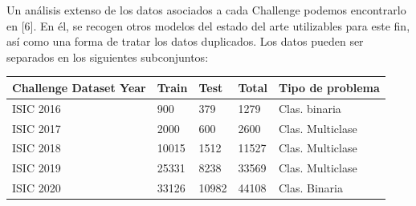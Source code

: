 Un análisis extenso de los datos asociados a cada Challenge podemos encontrarlo en [6]. En él, se recogen otros modelos del estado del arte utilizables para este fin, así como una forma de tratar los datos duplicados. Los datos pueden ser separados en los siguientes subconjuntos:

\begin{table}[H]
	\centering
	\begin{tabular}{|l|l|l|l|l|}
		\hline
		\textbf{Challenge Dataset Year} & \textbf{Train} & \textbf{Test} & \textbf{Total} & \textbf{Tipo de problema } \\ \hline
		ISIC 2016 & 900 & 379 & 1279 & Clas. binaria  \\ \hline
		ISIC 2017 & 2000 & 600 & 2600 & Clas. Multiclase  \\ \hline
		ISIC 2018 & 10015 & 1512 & 11527 & Clas. Multiclase  \\ \hline
		ISIC 2019 & 25331 & 8238 & 33569 & Clas. Multiclase  \\ \hline
		ISIC 2020 & 33126 & 10982 & 44108 & Clas. Binaria  \\ \hline
	\end{tabular}
\end{table}

